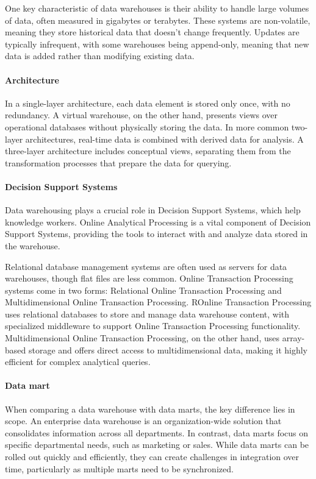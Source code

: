 One key characteristic of data warehouses is their ability to handle large volumes of data, often measured in gigabytes or terabytes. 
These systems are non-volatile, meaning they store historical data that doesn't change frequently. 
Updates are typically infrequent, with some warehouses being append-only, meaning that new data is added rather than modifying existing data.

\paragraph*{Architecture}
In a single-layer architecture, each data element is stored only once, with no redundancy. 
A virtual warehouse, on the other hand, presents views over operational databases without physically storing the data. 
In more common two-layer architectures, real-time data is combined with derived data for analysis. 
A three-layer architecture includes conceptual views, separating them from the transformation processes that prepare the data for querying.

\paragraph*{Decision Support Systems}
Data warehousing plays a crucial role in Decision Support Systems, which help knowledge workers. 
Online Analytical Processing is a vital component of Decision Support Systems, providing the tools to interact with and analyze data stored in the warehouse.

Relational database management systems are often used as servers for data warehouses, though flat files are less common. 
Online Transaction Processing systems come in two forms: Relational Online Transaction Processing and Multidimensional Online Transaction Processing. 
ROnline Transaction Processing uses relational databases to store and manage data warehouse content, with specialized middleware to support Online Transaction Processing functionality. 
Multidimensional Online Transaction Processing, on the other hand, uses array-based storage and offers direct access to multidimensional data, making it highly efficient for complex analytical queries.

\paragraph*{Data mart}
When comparing a data warehouse with data marts, the key difference lies in scope.
An enterprise data warehouse is an organization-wide solution that consolidates information across all departments.
In contrast, data marts focus on specific departmental needs, such as marketing or sales.
While data marts can be rolled out quickly and efficiently, they can create challenges in integration over time, particularly as multiple marts need to be synchronized.

